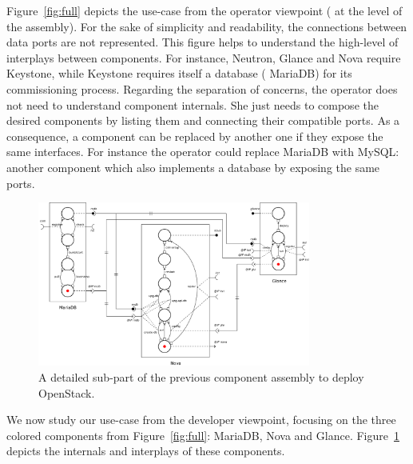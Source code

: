 Figure~\ref{fig:full} depicts the use-case from the operator viewpoint (\ie
at the level of the \mad assembly). For the sake of simplicity and
readability, the connections between data ports are not
represented. This figure helps to understand the high-level of
interplays between components. For instance, Neutron, Glance and Nova
require Keystone, while Keystone requires itself a database (\ie
MariaDB) for its commissioning process. Regarding the separation of
concerns, the operator does not need to understand component
internals. She just needs to compose the desired components by listing
them and connecting their compatible ports. As a consequence, a
component can be replaced by another one if they expose the same
interfaces. For instance the operator could replace MariaDB with
MySQL: another component which also implements a database by exposing
the same ports.

\begin{figure}[t]
  \begin{center}
    \includegraphics[width=0.8\textwidth]{./images/sub.pdf}
    \caption{A detailed sub-part of the previous component assembly to deploy
    OpenStack.}
    \label{fig:sub}
  \end{center}
\end{figure}

We now study our use-case from the developer viewpoint, focusing on
the three colored components from Figure~\ref{fig:full}: MariaDB, Nova and
Glance. Figure~\ref{fig:sub} depicts the internals and interplays of these
components.

